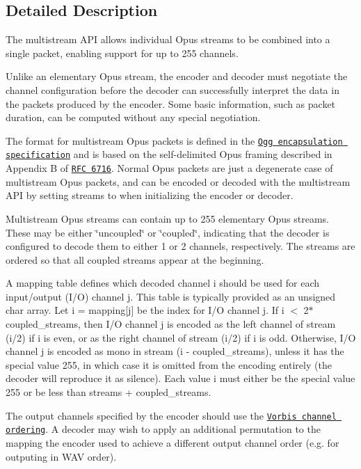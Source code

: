 \subsection{Detailed Description}
The multistream A\+PI allows individual Opus streams to be combined into a single packet, enabling support for up to 255 channels. 

Unlike an elementary Opus stream, the encoder and decoder must negotiate the channel configuration before the decoder can successfully interpret the data in the packets produced by the encoder. Some basic information, such as packet duration, can be computed without any special negotiation.

The format for multistream Opus packets is defined in the \href{https://tools.ietf.org/html/draft-ietf-codec-oggopus}{\tt Ogg encapsulation specification} and is based on the self-\/delimited Opus framing described in Appendix B of \href{https://tools.ietf.org/html/rfc6716}{\tt R\+FC 6716}. Normal Opus packets are just a degenerate case of multistream Opus packets, and can be encoded or decoded with the multistream A\+PI by setting {\ttfamily streams} to {} when initializing the encoder or decoder.

Multistream Opus streams can contain up to 255 elementary Opus streams. These may be either \char`\"{}uncoupled\char`\"{} or \char`\"{}coupled\char`\"{}, indicating that the decoder is configured to decode them to either 1 or 2 channels, respectively. The streams are ordered so that all coupled streams appear at the beginning.

A {\ttfamily mapping} table defines which decoded channel {\ttfamily i} should be used for each input/output (I/O) channel {\ttfamily j}. This table is typically provided as an unsigned char array. Let {\ttfamily i = mapping\mbox{[}j\mbox{]}} be the index for I/O channel {\ttfamily j}. If {\ttfamily i $<$ 2$\ast$coupled\+\_\+streams}, then I/O channel {\ttfamily j} is encoded as the left channel of stream {\ttfamily (i/2)} if {\ttfamily i} is even, or as the right channel of stream {\ttfamily (i/2)} if {\ttfamily i} is odd. Otherwise, I/O channel {\ttfamily j} is encoded as mono in stream {\ttfamily (i -\/ coupled\+\_\+streams)}, unless it has the special value 255, in which case it is omitted from the encoding entirely (the decoder will reproduce it as silence). Each value {\ttfamily i} must either be the special value 255 or be less than {\ttfamily streams + coupled\+\_\+streams}.

The output channels specified by the encoder should use the \href{https://www.xiph.org/vorbis/doc/Vorbis_I_spec.html#x1-810004.3.9}{\tt Vorbis channel ordering}. A decoder may wish to apply an additional permutation to the mapping the encoder used to achieve a different output channel order (e.\+g. for outputing in W\+AV order).

